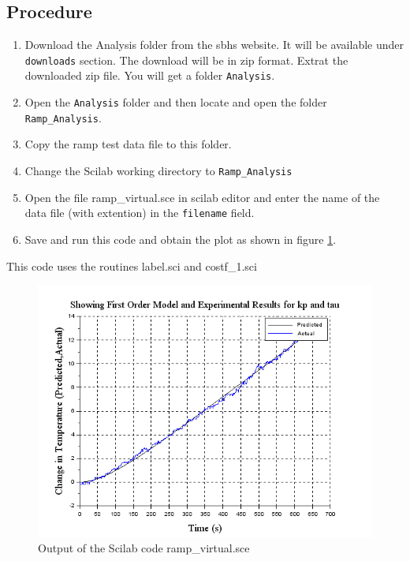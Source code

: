 \subsection{Procedure}
\begin{enumerate}
\item Download the Analysis folder from the sbhs website. It will be available under {\tt downloads} section. The download will be in zip format. Extrat the downloaded zip file. You will get a folder {\tt Analysis}. 
\item Open the {\tt Analysis} folder and then locate and open the folder {\tt Ramp\_Analysis}.
 \item Copy the ramp test data file to this folder.
 \item Change the Scilab working directory to  {\tt Ramp\_Analysis}
 \item Open the file {\ttfamily ramp\_virtual.sce} in scilab editor and enter the name of the data file (with extention) in the {\tt filename} field. 
\item Save and run this code and obtain the plot as shown in figure \ref{firstorder_ramp}. 
\end{enumerate}
This code uses the routines {\ttfamily label.sci} and {\ttfamily costf\_1.sci}

\begin{figure} 
\centering
\includegraphics[width=\linewidth]{Ramp-test_manual/ramp-analysis.png}
\caption{Output of the Scilab code {\ttfamily ramp\_virtual.sce}}
\label{firstorder_ramp}
\end{figure} \label{firstorderplot}

